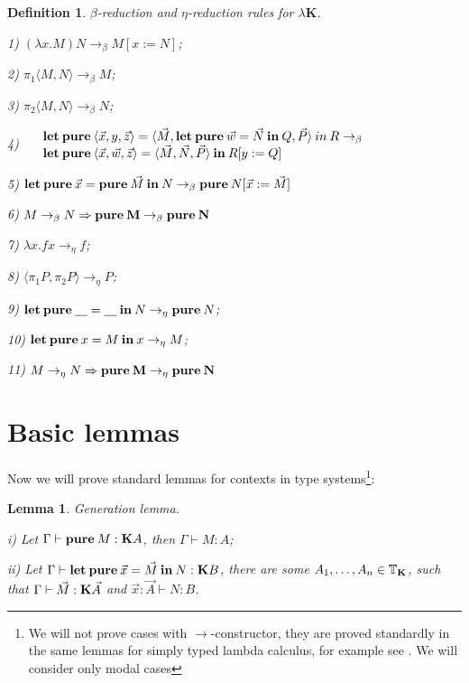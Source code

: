 \documentclass[a4paper]{article}
\newtheorem{lemma}{Lemma}
\newtheorem{defin}{Definition}
\begin{document}
  \begin{defin} $\beta$-reduction and $\eta$-reduction rules for \emph{$\lambda \textbf{K}$}.

  1) $(\lambda x. M) N \rightarrow_{\beta} M [x := N]$;

  2) $\pi_1 \langle M, N \rangle \rightarrow_{\beta} M$;

  3) $\pi_2 \langle M, N \rangle \rightarrow_{\beta} N$;

  4) $\begin{array}{llll}
  & {\bf let \: pure \:} \langle \vec{x}, y, \vec{z} \rangle = \langle \vec{M}, {\bf let \: pure \: } \vec{w} = \vec{N} {\bf \: in \: } Q, \vec{P} \rangle {\: in \:} R \rightarrow_{\beta} & \\
  & {\bf let \: pure \:} \langle \vec{x}, \vec{w}, \vec{z} \rangle = \langle \vec{M}, \vec{N}, \vec{P} \rangle \: { \bf in } \: R [y := Q]
  \end{array}$

  5) ${\bf let \: pure \:} \vec{x} = {\bf pure \:} \vec{M} {\: \bf in \:} N \rightarrow_{\beta} {\bf pure \:} N [\vec{x} := \vec{M}]$

  6) $M \rightarrow_{\beta} N \Rightarrow {\bf pure \: M} \rightarrow_{\beta} {\bf pure \: N}$

  7) $\lambda x. f x \rightarrow_{\eta} f$;

  8) $\langle \pi_1 P, \pi_2 P \rangle \rightarrow_{\eta} P$;

  9) ${\bf let \: pure \:} \underline{\quad} = \underline{\quad} {\: \bf in \:} N \rightarrow_{\eta} {\bf pure \:} N$;

  10) ${\bf let \: pure \:} x = M {\: \bf in \: } x \rightarrow_{\eta} M$;

  11) $M \rightarrow_{\eta} N \Rightarrow {\bf pure \: M} \rightarrow_{\eta} {\bf pure \: N}$
  \end{defin}


  \section{Basic lemmas}

  Now we will prove standard lemmas for contexts in type systems\footnote{We will not prove cases with
  $\to$-constructor, they are proved standardly in the same lemmas for simply typed lambda calculus, for
  example see \cite{Neder}\cite{Morten}\cite{Girard}. We will consider only modal cases}:

\begin{lemma} Generation lemma.

  i) Let $\Gamma \vdash {\bf pure \:} M : {\bf K}A$, then $\Gamma \vdash M : A$;

  ii) Let $\Gamma \vdash {\bf let \: pure \:} \vec{x} = \vec{M} {\: \bf in \:} N : {\bf K}B$, there are some $A_1,\dots,A_n \in \mathbb{T}_{{\bf K}}$,
  such that $\Gamma \vdash \vec{M} : {\bf K} \vec{A}$ and $\vec{x} : \vec{A} \vdash N : B$.
\end{lemma}
\end{document}
